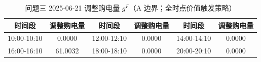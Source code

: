 \begin{table}[htbp]
\centering
\caption{问题三 2025-06-21 调整购电量 $g^F$（A 边界；全时点价值触发策略）}\label{tab:q3-adjust}
\normalsize\setlength{\tabcolsep}{5pt}
\begin{tabular}{@{}cccccc@{}}
\toprule
时间段 & 调整购电量 & 时间段 & 调整购电量 & 时间段 & 调整购电量 \\
\midrule
10:00-10:10 & 0.0000 & 12:00-12:10 & 0.0000 & 14:00-14:10 & 0.0000 \\
16:00-16:10 & 61.0032 & 18:00-18:10 & 0.0000 & 20:00-20:10 & 0.0000 \\
\bottomrule
\end{tabular}
\end{table}
